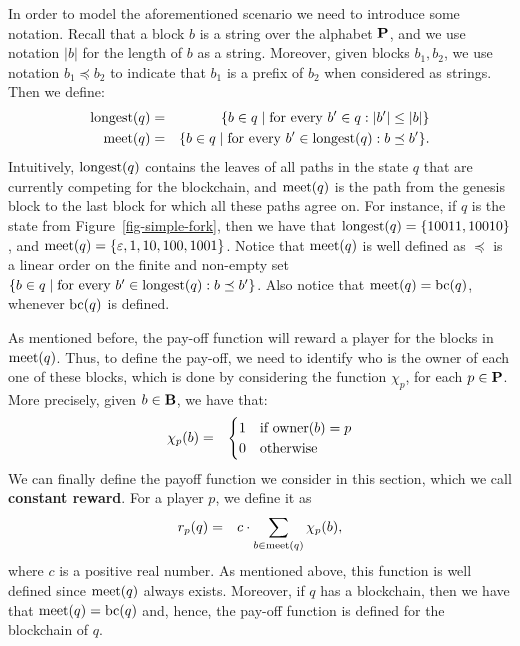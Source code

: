 In order to model the aforementioned scenario we need to introduce some notation.
Recall that a block $b$ is a string over the alphabet $\mathbf{P}$, and we use notation $|b|$ for the length of $b$ as a string. Moreover, given blocks $b_1, b_2$, we use notation $b_1 \preceq b_2$ to indicate that $b_1$ is a prefix of $b_2$  when considered as strings. Then we define: 
\begin{eqnarray*}
{\text{\rm longest}}(q) & = & \{ b \in q \mid \text{for every } b' \in q: |b'| \leq |b|\}\\
\text{\rm meet}(q) & = & \{b \in q \mid \text{for every } b' \in {\text{\rm longest}}(q): b \preceq b'\}.
\end{eqnarray*}
Intuitively, ${\text{\rm longest}}(q)$ contains the leaves of all paths in the state $q$ that are currently competing for the blockchain, and $\text{\rm meet}(q)$ is the path from the genesis block to the last block for which all these paths agree on. For instance, if $q$ is the state from Figure~\ref{fig-simple-fork}, then we have that ${\text{\rm longest}}(q)=\{10011,10010\}$, and $\text{\rm meet}(q)=\{\varepsilon, 1, 10, 100, 1001\}$. Notice that $\text{\rm meet}(q)$ is well defined as $\preceq$ is a linear order on the finite and non-empty set $\{b \in q \mid \text{for every } b' \in {\text{\rm longest}}(q): b \preceq b'\}$. Also notice that $\text{\rm meet}(q)=\text{bc}(q)$, whenever $\text{bc}(q)$ is defined.


As mentioned before, the pay-off function will reward a player for the blocks in $\text{\rm meet}(q)$. Thus, to define the pay-off, we need to identify who is the owner of each one of these blocks, which is done by considering the function $\chi_p$, for each $p \in \mathbf{P}$. More precisely, given $b \in \mathbf{B}$, we have that:
\begin{eqnarray*}
\chi_p(b) & = & 
\begin{cases}
1 & \text{if } \text{\rm owner}(b) = p\\
0 & \text{otherwise}
\end{cases}
\end{eqnarray*}
We can finally define the payoff function we consider in this section, which we call \textbf{constant reward}. For a player $p$, we define it as 
\begin{eqnarray*}
r_p(q) & = & 
{\displaystyle c \cdot \sum_{b \in \text{\rm meet}(q)} \chi_p(b),}
\end{eqnarray*}
where $c$ is a positive real number. As mentioned above, this function is well defined since $\text{\rm meet}(q)$ always exists. Moreover, if $q$ has a blockchain, then we have that $\text{\rm meet}(q) = \text{bc}(q)$ and, hence, the pay-off function is defined for the blockchain of $q$.
 
